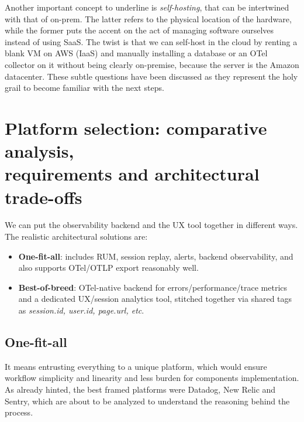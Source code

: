 \documentclass[12pt,a4paper,openright,twoside]{book}
\begin{document}
 Another important concept to underline is \textit{self-hosting}, that can be intertwined with that of on-prem. The latter refers to the physical location of the hardware, while the former puts the accent on the act of managing software ourselves instead of using SaaS. The twist is that we can self-host in the cloud by renting a blank \ac{VM} on AWS (\ac{IaaS}) and manually installing a database or an OTel collector on it without being clearly on-premise, because the server is the Amazon datacenter. These subtle questions have been discussed as they represent the holy grail to become familiar with the next steps. 

\section{Platform selection: comparative analysis, \\ requirements and architectural trade-offs} 

We can put the observability backend and the UX tool together in different ways. The realistic architectural solutions are:
\begin{itemize}
    \item \textbf{One-fit-all}: includes RUM, session replay, alerts, backend observability, and also supports OTel/OTLP export reasonably well.
    \item \textbf{Best-of-breed}: OTel-native backend for errors/performance/trace metrics and a dedicated UX/session analytics tool, stitched together via shared tags as \textit{session.id, user.id, page.url, etc}. 
\end{itemize}

\subsection{One-fit-all}

It means entrusting everything to a unique platform, which would ensure workflow simplicity and linearity and less burden for components implementation. As already hinted, the best framed platforms were Datadog, New Relic and Sentry, which are about to be analyzed to understand the reasoning behind the process. 
\end{document}
